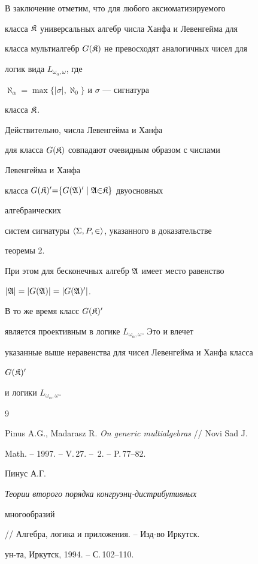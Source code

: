  


В заключение отметим, что для любого аксиоматизируемого 


класса $\frak K$ универсальных алгебр числа Ханфа и Левенгейма для 


класса мультиалгебр $G(\frak K)$ не превосходят аналогичных чисел для 


логик вида $L_{\omega_\alpha,\omega}$, где 


$\aleph_\alpha=\max\{|\sigma|,\aleph_0\}$ и $\sigma$ --- сигнатура 


класса $\frak K$. 


Действительно, числа Левенгейма и Ханфа 


для класса $G(\frak K)$ совпадают очевидным образом с числами 


Левенгейма и Ханфа 


класса $G(\frak K)'{=}\{G(\frak A)'\mid\frak A{\in}\frak K\}$ двуосновных 


алгебраических 


систем сигнатуры $\langle\Sigma,P,{\in}\rangle$, указанного в доказательстве 


теоремы 2. 


При этом для бесконечных алгебр $\frak A$ имеет место равенство 


$|\frak A|=|G(\frak A)|=|G(\frak A)'|$. 


В то же время класс $G(\frak K)'$ 


является проективным в логике $L_{\omega_\alpha,\omega}$. Это и влечет 


указанные выше неравенства для чисел Левенгейма и Ханфа класса 


$G(\frak K)'$ 


и логики $L_{\omega_\alpha,\omega}$. 


 


\begin{thebibliography}{9} 


 




Pinus A.G., Madarasz R. {\em On generic multialgebras} // Novi Sad J. 


Math. -- 1997. -- V.\,27. -- \No\,2. -- P.\,77--82. 




Пинус А.Г. {\em Теории второго порядка конгруэнц-дистрибутивных 


многообразий} // Алгебра, логика и приложения. -- Изд-во Иркутск.


ун-та, Иркутск, 1994. -- С.\,102--110. 


 


\end{thebibliography} 


 


\vskip 2cm 


 






 


\label{end} 


 


